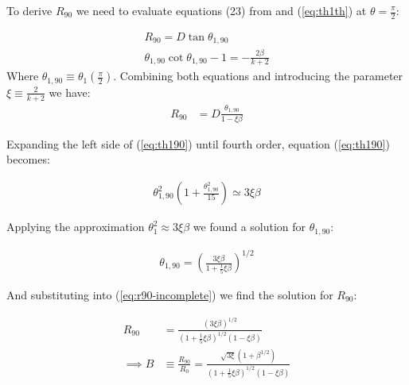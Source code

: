 To derive $R_{90}$ we need to evaluate equations (23) from \CRW{} and (\ref{eq:th1th})
at $\theta=\frac{\pi}{2}$:

\begin{align}
R_{90} = D\tan\theta_{1,90} \\
\theta_{1,90}\cot\theta_{1,90} -1 = -\frac{2\beta}{k+2} \label{eq:th190}
\end{align}
Where $\theta_{1,90}\equiv \theta_1(\frac{\pi}{2})$. Combining both equations and  introducing
the parameter $\xi\equiv \frac{2}{k+2}$ we have:
\begin{align}
R_{90} &= D\frac{\theta_{1,90}}{1-\xi\beta} \label{eq:r90-incomplete}
\end{align}

Expanding the left side of (\ref{eq:th190}) until fourth order, equation (\ref{eq:th190})
becomes:

\begin{align}
\theta_{1,90}^2\left(1+\frac{\theta_{1,90}^2}{15}\right) \simeq 3\xi\beta
\end{align}

Applying the approximation $\theta_1^2 \approx 3\xi\beta$ we found a solution
for $\theta_{1,90}$:

\begin{align}
\theta_{1,90} = \left(\frac{3\xi\beta}{1+\frac{1}{5}\xi\beta}\right)^{1/2}
\end{align}

And substituting into (\ref{eq:r90-incomplete}) we find the solution for $R_{90}$:

\begin{align}
R_{90} &= \frac{\left(3\xi\beta\right)^{1/2}}{\left(1+\frac{1}{5}\xi\beta\right)^{1/2}
\left(1-\xi\beta\right)} \\
\implies B &\equiv \frac{R_{90}}{R_0} = \frac{\sqrt{3\xi}\left(1+\beta^{1/2}\right)}
{\left(1+\frac{1}{5}\xi\beta\right)^{1/2}\left(1-\xi\beta\right)}
\end{align}

